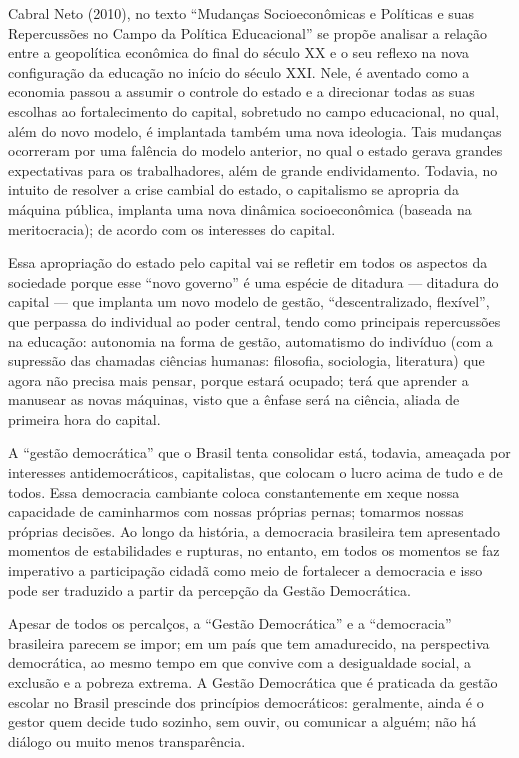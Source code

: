 \begin{refsection}
    Cabral Neto (2010), no texto “Mudanças Socioeconômicas e Políticas e suas Repercussões no Campo da Política Educacional” se propõe analisar a relação entre a geopolítica econômica do final do século XX e o seu reflexo na nova configuração da educação no início do século XXI. Nele, é aventado como a economia passou a assumir o controle do estado e a direcionar todas as suas escolhas ao fortalecimento do capital, sobretudo no campo educacional, no qual, além do novo modelo, é implantada também uma nova ideologia. Tais mudanças ocorreram por uma falência do modelo anterior, no qual o estado gerava grandes expectativas para os trabalhadores, além de grande endividamento. Todavia, no intuito de resolver a crise cambial do estado, o capitalismo se apropria da máquina pública, implanta uma nova dinâmica socioeconômica (baseada na meritocracia); de acordo com os interesses do capital.   

    Essa apropriação do estado pelo capital vai se refletir em todos os aspectos da sociedade porque esse “novo governo” é uma espécie de ditadura --- ditadura do capital --- que implanta um novo modelo de gestão, “descentralizado, flexível”, que perpassa do individual ao poder central, tendo como principais repercussões na educação: autonomia na forma de gestão, automatismo do indivíduo (com a supressão das chamadas ciências humanas: filosofia, sociologia, literatura) que agora não precisa mais pensar, porque estará ocupado; terá que aprender a manusear as novas máquinas, visto que a ênfase será na ciência, aliada de primeira hora do capital.  

    A “gestão democrática” que o Brasil tenta consolidar está, todavia, ameaçada por interesses antidemocráticos, capitalistas, que colocam o lucro acima de tudo e de todos. Essa democracia cambiante coloca constantemente em xeque nossa capacidade de caminharmos com nossas próprias pernas; tomarmos nossas próprias decisões. Ao longo da história, a democracia brasileira tem apresentado momentos de estabilidades e rupturas, no entanto, em todos os momentos se faz imperativo a participação cidadã como meio de fortalecer a democracia e isso pode ser traduzido a partir da percepção da Gestão Democrática. 

    Apesar de todos os percalços, a ``Gestão Democrática'' e a “democracia” brasileira parecem se impor; em um país que tem amadurecido, na perspectiva democrática, ao mesmo tempo em que convive com a desigualdade social, a exclusão e a pobreza extrema.  A Gestão Democrática que é praticada da gestão escolar no Brasil prescinde dos princípios democráticos: geralmente, ainda é o gestor quem decide tudo sozinho, sem ouvir, ou comunicar a alguém; não há diálogo ou muito menos transparência.  


\end{refsection}
